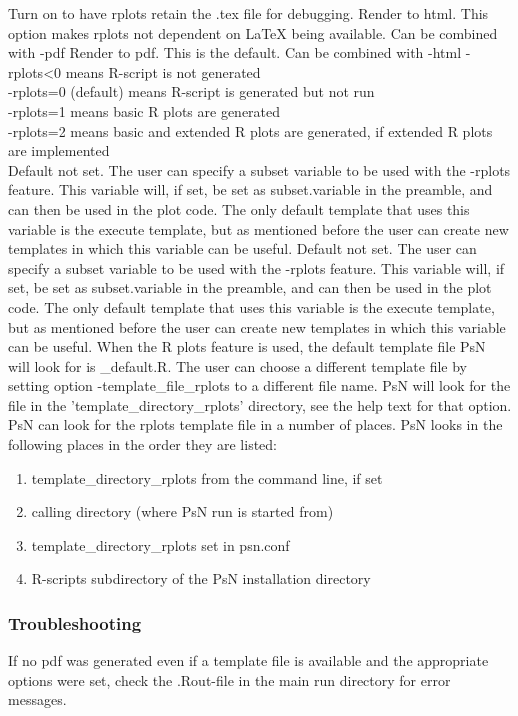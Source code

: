 \begin{optionlist}
Turn on to have rplots retain the .tex file for debugging.
\nextopt
        Render to html. This option makes rplots not dependent on LaTeX being available.
        Can be combined with -pdf
    \nextopt
        Render to pdf. This is the default. Can be combined with -html
    \nextopt
{}
-rplots<0 means R-script is not generated\\ 
-rplots=0 (default) means R-script is generated but not run\\ 
-rplots=1 means basic R plots are generated\\													  
-rplots=2 means basic and extended R plots are generated, if extended R plots are implemented\\													  
\nextopt
{}
Default not set. The user can specify a subset variable to be used with the -rplots feature. This variable will, if set, be set as subset.variable in the preamble, and can then be used in the plot code. The only default template that uses this variable is the execute template, but as mentioned before the user can create new templates in which this variable can be useful.
\nextopt
{}
Default not set. The user can specify a subset variable to be used with the -rplots feature. This variable will, if set, be set as subset.variable in the preamble, and can then be used in the plot code.  The only default template that uses this variable is the execute template, but as mentioned before the user can create new templates in which this variable can be useful.
\nextopt
{}
When the R plots feature is used, the default template file PsN will look for is \guidetoolname\_default.R. The user can choose a different template file by setting option -template\_file\_rplots to a different file name. PsN will look for the file in the 'template\_directory\_rplots' directory, see the help text for that option.
\nextopt
{}
PsN can look for the rplots template file in a number of places. PsN looks in the following places in the order they are listed:
\begin{enumerate}
\item template\_directory\_rplots from the command line, if set 
\item calling directory (where PsN run is started from)
\item template\_directory\_rplots set in psn.conf 
\item R-scripts subdirectory of the PsN installation directory
\end{enumerate}
\nextopt

\end{optionlist}

\subsubsection*{Troubleshooting}
If no pdf was generated even if a template file is available and the appropriate options were set, check the .Rout-file in the main run directory for error messages.
